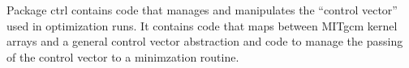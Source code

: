 Package ctrl contains code that manages and manipulates the 
``control vector'' used in optimization runs. It contains code
that maps between MITgcm kernel arrays and a general control vector 
abstraction and code to manage the passing of the control vector to a 
minimzation routine.
